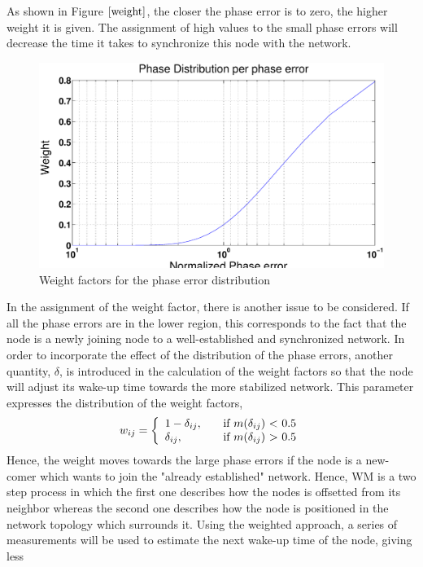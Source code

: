 \documentclass[a4paper,10pt]{report}
\begin{document}
\newline
As shown in Figure $\ref{weight}$, the closer the phase error is to zero, the higher weight it is given. The assignment of high
values to the small phase errors will decrease the time it takes to synchronize this node with the network.
\begin{figure}
\centering
\includegraphics[width= 0.75 \textwidth]{weight}
\caption{Weight factors for the phase error distribution}
\label{weight}
\end{figure}
\newline
In the assignment of the weight factor, there is another issue to be considered. If all the phase errors are in the lower region, this
corresponds to the fact that the node is a newly joining node to a well-established and synchronized network.  In order to incorporate the
effect of the distribution of the phase errors, another quantity, $\delta$, is introduced in the calculation of the weight factors so
that the node will adjust its wake-up time towards the more stabilized network. This parameter expresses the distribution of the
weight factors,
\[w_{ij} = \left\{
\begin{array}{l l}
  1 - \delta_{ij},& \quad \mbox{if $m(\delta_{ij}$) $<$ 0.5}\\
 \delta_{ij}, & \quad \mbox{if $m(\delta_{ij}$) $>$ 0.5}\\ \end{array} \right. \]
Hence, the weight moves towards the large phase errors if the node is a new-comer which wants to join the "already established"
network. 
\newline Hence, WM is a two step process in which the first one describes how the nodes is offsetted from its neighbor whereas the second one describes how the node is positioned in the network topology which surrounds it.
\newline
Using the weighted approach, a series of measurements will be used to estimate the next wake-up time of the node, giving less
\end{document}
